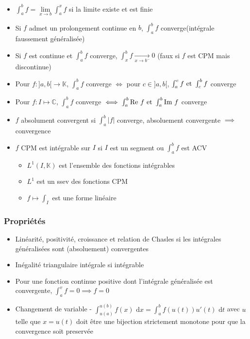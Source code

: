 \documentclass[openany]{book}
\begin{document}
\begin{itemize}
    \item $\int_{a}^{b}f = \underset{x \rightarrow b}{\lim} \int_{a}^{x} f$ si la limite existe et est finie
    \item Si $f$ admet un prolongement continue en $b$, $\int_{a}^{b}f$ converge(intégrale faussement généralisée)
    \item Si $f$ est continue et $\int_{a}^{b}f$ converge, $ \int_{x}^{b}f \underset{x \rightarrow b^{-}}{\longrightarrow} 0$ (faux si $f$ est CPM mais discontinue)
    \item Pour $f : ]a, b[ \rightarrow \mathbb{K}$, $\int_{a}^{b} f$ converge $\iff$ pour $c \in ]a, b[$, $\int_{a}^{c}f \text{ et } \int_{c}^{b}f$ converge  
    \item Pour $f : I \mapsto \mathbb{C}$, $\int_{a}^{b}f$ converge $\iff \int_{a}^{b} \text{Re }f \text{ et } \int_{a}^{b} \text{Im }f$ converge
    \item $f$ absolument convergent si $\int_{a}^{b} |f|$ converge, absoluement convergente $\implies$ convergence
    \item $f$ CPM est intégrable sur $I$ si $I$ est un segment ou $\int_{a}^{b}f$ est ACV
    \begin{itemize}
        \item $L^1(I, \mathbb{K})$ est l'ensemble des fonctions intégrables
        \item $L^1$ est un ssev des fonctions CPM
        \item $f \mapsto \int_{I}$ est une forme linéaire
    \end{itemize}
\end{itemize}

\subsubsection{Propriétés}

\begin{itemize}
    \item Linéarité, positivité, croissance et relation de Chasles si les intégrales généralisées sont (absoluement) convergentes
    \item Inégalité triangulaire intégrale si intégrable
    \item Pour une fonction continue positive dont l'intégrale généralisée est convergente, $\int_{a}^{v}f = 0 \implies f = 0$
    \item Changement de variable - $\int_{u(a)}^{u(b)} f(x) \text{ d}x = \int_{a}^{b} f(u(t)) u'(t) \text{ d}t$ avec $u$ telle que $x = u(t)$ doit être une bijection strictement monotone pour que la convergence soit preservée
\end{itemize}
\end{document}
